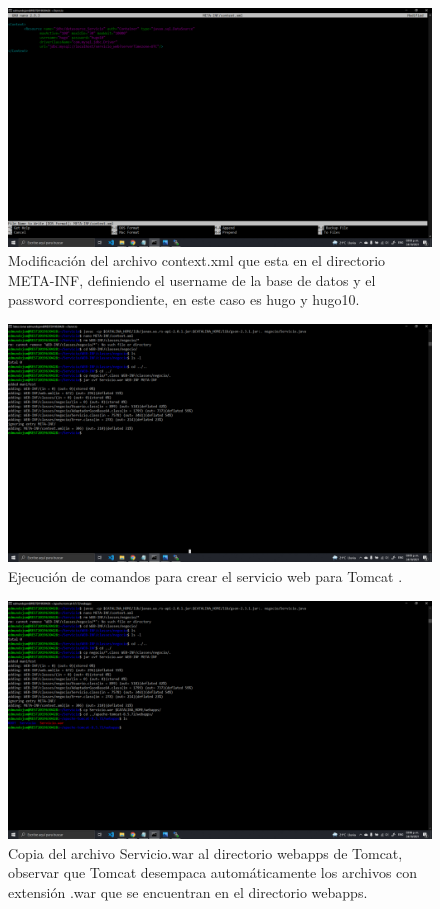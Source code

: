 \documentclass[11pt]{article}
\begin{document}
		\begin{figure}[H]
			\centering
			\includegraphics[scale=0.34]{resources/ced5.png}
			\caption{Modificación del archivo context.xml que esta en el directorio META-INF, definiendo el username de la base de datos y el password correspondiente, en este caso es hugo y hugo10.}\label{fig:picture}
		\end{figure}
		\begin{figure}[H]
			\centering
			\includegraphics[scale=0.34]{resources/ced6.png}
			\caption{Ejecución de comandos para crear el servicio web para Tomcat .}\label{fig:picture}
		\end{figure}
		\begin{figure}[H]
			\centering
			\includegraphics[scale=0.34]{resources/cedF.png}
			\caption{Copia del archivo Servicio.war al directorio webapps de Tomcat, observar que Tomcat desempaca automáticamente los archivos con extensión .war que se encuentran en el directorio webapps.}\label{fig:picture}
		\end{figure}
\end{document}
